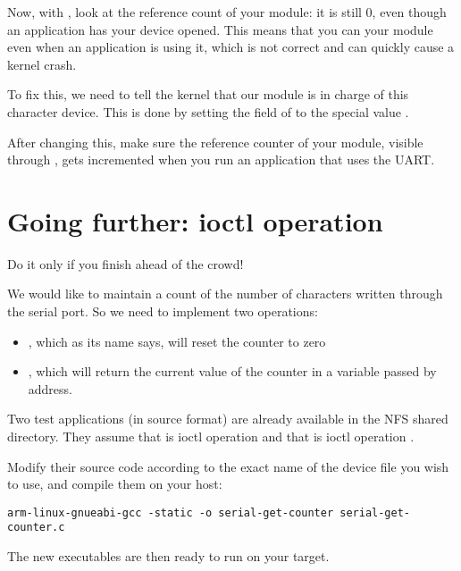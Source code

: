 Now, with , look at the reference count of your module: it
is still 0, even though an application has your device opened. This
means that you can  your module even when an application
is using it, which is not correct and can quickly cause a kernel
crash.

To fix this, we need to tell the kernel that our module is in charge
of this character device. This is done by setting the 
field of  to the special value
.

After changing this, make sure the reference counter of your module,
visible through , gets incremented when you run an
application that uses the UART.

\section{Going further: ioctl operation}

Do it only if you finish ahead of the crowd!

We would like to maintain a count of the number of characters
written through the serial port. So we need to implement two
 operations:
\begin{itemize}

 \item {}, which as its name says, will
   reset the counter to zero

 \item {}, which will return the current
   value of the counter in a variable passed by address.

\end{itemize}

Two test applications (in source format) are already available in the
 NFS shared directory.
They assume that  is ioctl operation 
and that  is ioctl operation .

Modify their source code according to the exact name of the device file
you wish to use, and compile them on your host:

\begin{verbatim}
arm-linux-gnueabi-gcc -static -o serial-get-counter serial-get-counter.c
\end{verbatim}

The new executables are then ready to run on your target.
